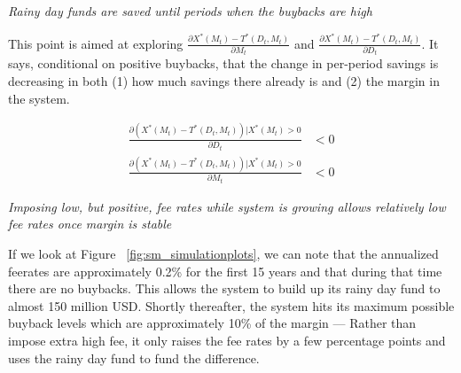 \vspace{0.25cm}

\textit{Rainy day funds are saved until periods when the buybacks are high}

This point is aimed at exploring $\frac{\partial X^*(M_t) - T^*(D_t, M_t)}{\partial M_t}$ and
$\frac{\partial X^*(M_t) - T^*(D_t, M_t)}{\partial D_t}$. It says, conditional on positive buybacks,
that the change in per-period savings is decreasing in both (1) how much savings there already is
and (2) the margin in the system.

\begin{align*}
  \frac{\partial (X^*(M_t) - T^*(D_t, M_t)) | X^*(M_t) > 0}{\partial D_t} &< 0 \\
  \frac{\partial (X^*(M_t) - T^*(D_t, M_t)) | X^*(M_t) > 0}{\partial M_t} &< 0
\end{align*}

\vspace{0.25cm}

\textit{Imposing low, but positive, fee rates while system is growing allows relatively low fee rates once margin is stable}

If we look at Figure ~\ref{fig:sm_simulationplots}, we can note that the annualized feerates are
approximately 0.2\% for the first 15 years and that during that time there are no buybacks. This
allows the system to build up its rainy day fund to almost 150 million USD. Shortly thereafter, the
system hits its maximum possible buyback levels which are approximately 10\% of the margin ---
Rather than impose extra high fee, it only raises the fee rates by a few percentage points and uses
the rainy day fund to fund the difference.
